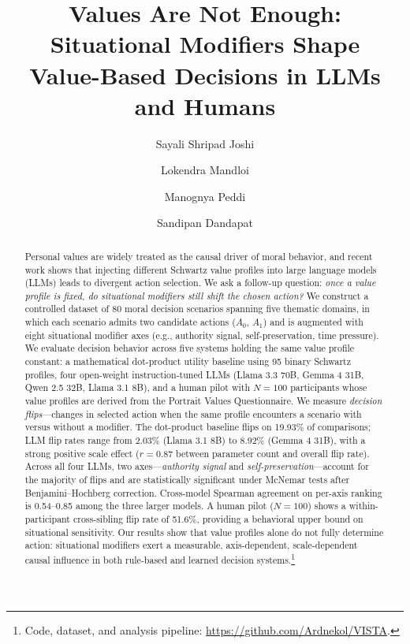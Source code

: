 \documentclass[11pt]{article}
\title{\textbf{Values Are Not Enough: Situational Modifiers Shape\\Value-Based Decisions in LLMs and Humans}}
\author[1]{Sayali Shripad Joshi}
\author[1]{Lokendra Mandloi}
\author[1]{Manognya Peddi}
\author[1]{Sandipan Dandapat}
\affil[1]{Department of Computer Science and Engineering, IIT Hyderabad\\
\texttt{\{cs24mtech12003, cs24mtech11024, cs24mtech12020\}@iith.ac.in, sdandapat@cse.iith.ac.in}}
\date{}
\begin{document}
\maketitle

\begin{abstract}
\noindent
Personal values are widely treated as the causal driver of moral behavior, and recent work shows that injecting different Schwartz value profiles into large language models (LLMs) leads to divergent action selection. We ask a follow-up question: \emph{once a value profile is fixed, do situational modifiers still shift the chosen action?} We construct a controlled dataset of 80 moral decision scenarios spanning five thematic domains, in which each scenario admits two candidate actions ($A_0$, $A_1$) and is augmented with eight situational modifier axes (e.g., authority signal, self-preservation, time pressure). We evaluate decision behavior across five systems holding the same value profile constant: a mathematical dot-product utility baseline using 95 binary Schwartz profiles, four open-weight instruction-tuned LLMs (Llama 3.3 70B, Gemma 4 31B, Qwen 2.5 32B, Llama 3.1 8B), and a human pilot with $N=100$ participants whose value profiles are derived from the Portrait Values Questionnaire. We measure \emph{decision flips}---changes in selected action when the same profile encounters a scenario with versus without a modifier. The dot-product baseline flips on 19.93\% of comparisons; LLM flip rates range from 2.03\% (Llama 3.1 8B) to 8.92\% (Gemma 4 31B), with a strong positive scale effect ($r=0.87$ between parameter count and overall flip rate). Across all four LLMs, two axes---\emph{authority signal} and \emph{self-preservation}---account for the majority of flips and are statistically significant under McNemar tests after Benjamini--Hochberg correction. Cross-model Spearman agreement on per-axis ranking is 0.54--0.85 among the three larger models. A human pilot ($N=100$) shows a within-participant cross-sibling flip rate of 51.6\%, providing a behavioral upper bound on situational sensitivity. Our results show that value profiles alone do not fully determine action: situational modifiers exert a measurable, axis-dependent, scale-dependent causal influence in both rule-based and learned decision systems.\footnote{Code, dataset, and analysis pipeline: \url{https://github.com/Ardnekol/VISTA}.}
\end{abstract}
\end{document}
